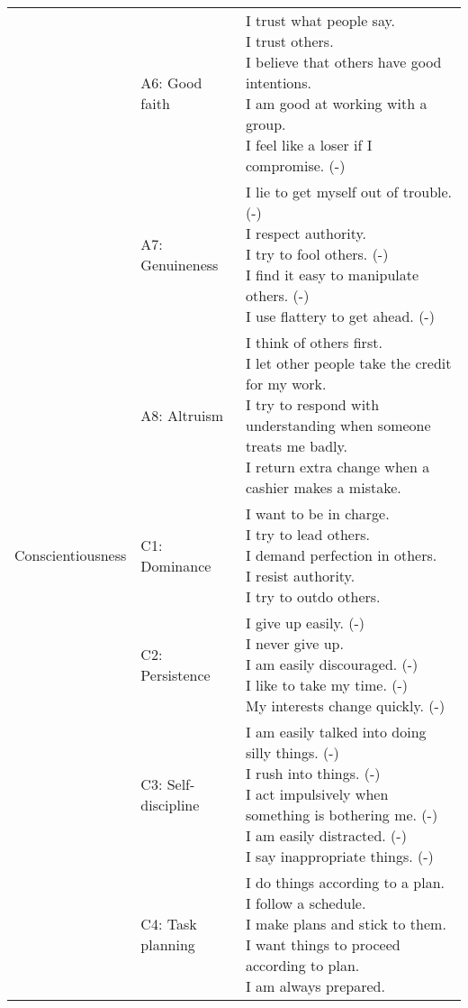 \documentclass[]{article}
\begin{document}
\begin{longtable}[t]{lll}
\addlinespace
 & A6: Good faith & \makecell[l]{I trust what people say.\\I trust others.\\I believe that others have good intentions.\\I am good at working with a group.\\I feel like a loser if I compromise. (-)}\\
\addlinespace
 & A7: Genuineness & \makecell[l]{I lie to get myself out of trouble. (-)\\I respect authority.\\I try to fool others. (-)\\I find it easy to manipulate others. (-)\\I use flattery to get ahead. (-)}\\
\addlinespace
 & A8: Altruism & \makecell[l]{I think of others first.\\I let other people take the credit for my work.\\I try to respond with understanding when someone treats me badly.\\I return extra change when a cashier makes a mistake.}\\
\addlinespace
Conscientiousness & C1: Dominance & \makecell[l]{I want to be in charge.\\I try to lead others.\\I demand perfection in others.\\I resist authority.\\I try to outdo others.}\\
\addlinespace
 & C2: Persistence & \makecell[l]{I give up easily. (-)\\I never give up.\\I am easily discouraged. (-)\\I like to take my time. (-)\\My interests change quickly. (-)}\\
\addlinespace
 & C3: Self-discipline & \makecell[l]{I am easily talked into doing silly things. (-)\\I rush into things. (-)\\I act impulsively when something is bothering me. (-)\\I am easily distracted. (-)\\I say inappropriate things. (-)}\\
\addlinespace
 & C4: Task planning & \makecell[l]{I do things according to a plan.\\I follow a schedule.\\I make plans and stick to them.\\I want things to proceed according to plan.\\I am always prepared.}\\

\end{longtable}
\end{document}

